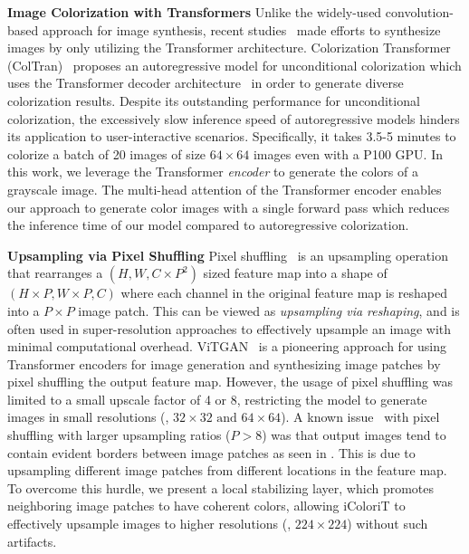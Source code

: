 \documentclass[10pt,twocolumn,letterpaper]{article}
\begin{document}
\vspace{+0.1cm}
\noindent \textbf{Image Colorization with Transformers} 
Unlike the widely-used convolution-based approach for image synthesis, recent studies~\cite{coltran, mae, simmim, vitgan} made efforts to synthesize images by only utilizing the Transformer architecture. 
Colorization Transformer (ColTran)~\cite{coltran} proposes an autoregressive model for unconditional colorization which uses the Transformer decoder architecture~\cite{attention} in order to generate diverse colorization results. 
Despite its outstanding performance for unconditional colorization, the excessively slow inference speed of autoregressive models hinders its application to user-interactive scenarios. 
Specifically, it takes 3.5-5 minutes to colorize a batch of 20 images of size $64\times 64$ images even with a P100 GPU. 
In this work, we leverage the Transformer \textit{encoder} to generate the colors of a grayscale image. 
The multi-head attention of the Transformer encoder enables our approach to generate color images with a single forward pass which reduces the inference time of our model compared to autoregressive colorization. 


\noindent\textbf{Upsampling via Pixel Shuffling}
Pixel shuffling~\cite{pixelshuffle} is an upsampling operation that rearranges a $(H, W, C\times P^2)$ sized feature map into a shape of $(H\times P, W\times P, C)$ where each channel in the original feature map is reshaped into a $P\times P$ image patch. 
This can be viewed as \emph{upsampling via reshaping}, and is often used in super-resolution approaches to effectively upsample an image with minimal computational overhead. 
ViTGAN~\cite{vitgan} is a pioneering approach for using Transformer encoders for image generation and synthesizing image patches by pixel shuffling the output feature map. 
However, the usage of pixel shuffling was limited to a small upscale factor of 4 or 8, restricting the model to generate images in small resolutions (\eg, $32 \times 32 \text{ and } 64\times 64$). 
A known issue~\cite{mae} with pixel shuffling with larger upsampling ratios ($P > 8$) was that output images tend to contain evident borders between image patches as seen in . 
This is due to upsampling different image patches from different locations in the feature map. 
To overcome this hurdle, we present a local stabilizing layer, which promotes neighboring image patches to have coherent colors, allowing iColoriT to effectively upsample images to higher resolutions (\ie, $224\times 224$) without such artifacts. 
\end{document}
